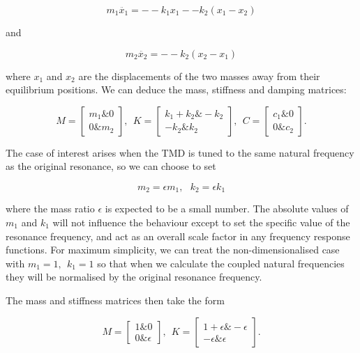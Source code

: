   \begin{equation*}m_1 \ddot{x_1} = -- k_1 x_1 -- k_2 (x_1 -x_2) 
  \tag{1}\end{equation*} 

  \noindent{}and 

  \begin{equation*}m_2 \ddot{x_2} = -- k_2 (x_2 -x_1) \tag{2}\end{equation*} 

  \noindent{}where $x_1$ and $x_2$ are the displacements of the two masses away 
  from their equilibrium positions. We can deduce the mass, stiffness and 
  damping matrices: 

  \begin{equation*}M=\begin{bmatrix}m_1 \& 0\\ 0 \& 
  m_2\end{bmatrix},~~K=\begin{bmatrix}k_1+k_2 \& -k_2\\ -k_2 \& 
  k_2\end{bmatrix},~~C=\begin{bmatrix}c_1 \& 0\\ 0 \& c_2\end{bmatrix} . 
  \tag{3}\end{equation*} 

  The case of interest arises when the TMD is tuned to the same natural 
  frequency as the original resonance, so we can choose to set 

  \begin{equation*}m_2=\epsilon m_1,~~~k_2=\epsilon k_1 \tag{4}\end{equation*} 

  \noindent{}where the mass ratio $\epsilon$ is expected to be a small number. 
  The absolute values of $m_1$ and $k_1$ will not influence the behaviour 
  except to set the specific value of the resonance frequency, and act as an 
  overall scale factor in any frequency response functions. For maximum 
  simplicity, we can treat the non-dimensionalised case with $m_1=1,~~k_1=1$ so 
  that when we calculate the coupled natural frequencies they will be 
  normalised by the original resonance frequency. 

  The mass and stiffness matrices then take the form 

  \begin{equation*}M=\begin{bmatrix}1 \& 0\\ 0 \& 
  \epsilon\end{bmatrix},~~K=\begin{bmatrix}1+\epsilon \& -\epsilon\\ -\epsilon 
  \& \epsilon\end{bmatrix} . \tag{5}\end{equation*} 

